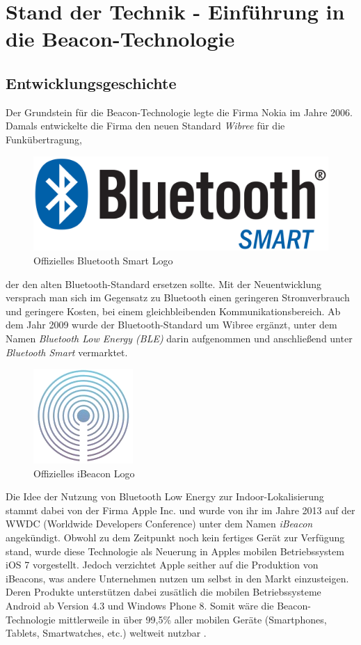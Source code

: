 \chapter{Stand der Technik - Einführung in die Beacon-Technologie}

\section{Entwicklungsgeschichte}
Der Grundstein für die Beacon-Technologie legte die Firma Nokia im Jahre 2006. Damals entwickelte die Firma den neuen Standard \textit{Wibree} für die Funkübertragung,
\begin{figure}
\centering
\includegraphics[scale=0.07]{Bilder/BLE.png} 
\caption{Offizielles Bluetooth Smart Logo \cite{BLElogo}}
\label{BLElogo}
\end{figure} der den alten Bluetooth-Standard ersetzen sollte. Mit der Neuentwicklung versprach man sich im Gegensatz zu Bluetooth einen geringeren Stromverbrauch und geringere Kosten, bei einem gleichbleibenden Kommunikationsbereich. Ab dem Jahr 2009 wurde der Bluetooth-Standard um Wibree ergänzt, unter dem Namen \textit{Bluetooth Low Energy (BLE)} darin aufgenommen \cite{Wib2BLE} und anschließend unter \textit{Bluetooth Smart} vermarktet.

\vspace{2\baselineskip}

\begin{figure}
\centering
\includegraphics[scale=0.5]{Bilder/iBeaconLogo.png} 
\caption{Offizielles iBeacon Logo \cite{iLogo}}
\label{iLogo}
\end{figure} Die Idee der Nutzung von Bluetooth Low Energy zur Indoor-Lokalisierung stammt dabei von der Firma Apple Inc. und wurde von ihr im Jahre 2013 auf der WWDC (Worldwide Developers Conference)\cite{Apple} unter dem Namen \textit{iBeacon} angekündigt. Obwohl zu dem Zeitpunkt noch kein fertiges Gerät zur Verfügung stand, wurde diese Technologie als Neuerung in Apples mobilen Betriebssystem iOS 7 vorgestellt. Jedoch verzichtet Apple seither auf die Produktion von iBeacons, was andere Unternehmen nutzen um selbst in den Markt einzusteigen. Deren Produkte unterstützen dabei zusätlich die mobilen Betriebssysteme Android ab Version 4.3 und Windows Phone 8. Somit wäre die Beacon-Technologie mittlerweile in über 99,5\% aller mobilen Geräte (Smartphones, Tablets, Smartwatches, etc.) weltweit nutzbar \cite{MobGerSt}.

